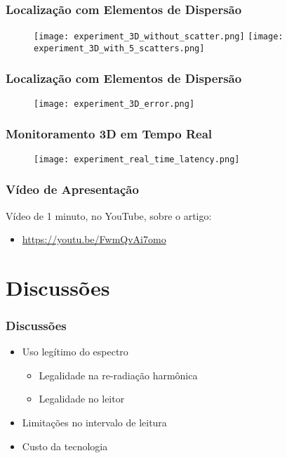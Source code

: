 \begin{frame}
  \frametitle{Localização com Elementos de Dispersão}

  \begin{figure}
          \centering
    \texttt{[image: experiment\_3D\_without\_scatter.png]}
                \vfill
    \texttt{[image: experiment\_3D\_with\_5\_scatters.png]}
        \end{figure}
\end{frame}

\begin{frame}
  \frametitle{Localização com Elementos de Dispersão}

  \begin{figure}
          \vfill
          \texttt{[image: experiment\_3D\_error.png]}
  \end{figure}
\end{frame}

\begin{frame}
  \frametitle{Monitoramento 3D em Tempo Real}

  \begin{figure}
          \vfill
          \texttt{[image: experiment\_real\_time\_latency.png]}
  \end{figure}
\end{frame}

\begin{frame}
  \frametitle{Vídeo de Apresentação}
    Vídeo de 1 minuto, no YouTube, sobre o artigo:
    \begin{itemize}
        \item \url{https://youtu.be/FwmQvAi7omo}
    \end{itemize}
\end{frame}

\section{Discussões}

\begin{frame}
  \frametitle{Discussões}

    \begin{itemize}
        \item Uso legítimo do espectro
            \begin{itemize}
                \item Legalidade na re-radiação harmônica
                \item Legalidade no leitor
            \end{itemize}
        \item Limitações no intervalo de leitura
        \item Custo da tecnologia
    \end{itemize}
\end{frame}

